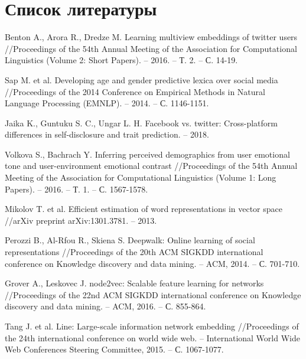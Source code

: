 \section{Список литературы}

\begingroup
\let\clearpage\relax
\vskip-3cm
\begin{thebibliography}{9}

Benton A., Arora R., Dredze M. Learning multiview embeddings of twitter users //Proceedings of the 54th Annual Meeting of the Association for Computational Linguistics (Volume 2: Short Papers). – 2016. – Т. 2. – С. 14-19.

Sap M. et al. Developing age and gender predictive lexica over social media //Proceedings of the 2014 Conference on Empirical Methods in Natural Language Processing (EMNLP). – 2014. – С. 1146-1151.

Jaika K., Guntuku S. C., Ungar L. H. Facebook vs. twitter: Cross-platform differences in self-disclosure and trait prediction. – 2018.

Volkova S., Bachrach Y. Inferring perceived demographics from user emotional tone and user-environment emotional contrast //Proceedings of the 54th Annual Meeting of the Association for Computational Linguistics (Volume 1: Long Papers). – 2016. – Т. 1. – С. 1567-1578.

Mikolov T. et al. Efficient estimation of word representations in vector space //arXiv preprint arXiv:1301.3781. – 2013.

Perozzi B., Al-Rfou R., Skiena S. Deepwalk: Online learning of social representations //Proceedings of the 20th ACM SIGKDD international conference on Knowledge discovery and data mining. – ACM, 2014. – С. 701-710.

Grover A., Leskovec J. node2vec: Scalable feature learning for networks //Proceedings of the 22nd ACM SIGKDD international conference on Knowledge discovery and data mining. – ACM, 2016. – С. 855-864.

Tang J. et al. Line: Large-scale information network embedding //Proceedings of the 24th international conference on world wide web. – International World Wide Web Conferences Steering Committee, 2015. – С. 1067-1077.


\end{thebibliography}
